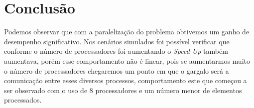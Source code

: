\documentclass[portuguese, conference]{IEEEtran}
\begin{document}
\section{Conclusão}

Podemos observar que com a paralelização do problema obtivemos um ganho de desempenho significativo. Nos cenários simulados foi possível verificar que conforme o número de processadores foi aumentando o {\it Speed Up} também aumentava, porém esse comportamento não é linear, pois se aumentarmos muito o número de processadores chegaremos um ponto em que o gargalo será a comunicação entre esses diversos processos, comportamento este que começou a ser observado com o uso de 8 processadores e um número menor de elementos processados.



\end{document}
